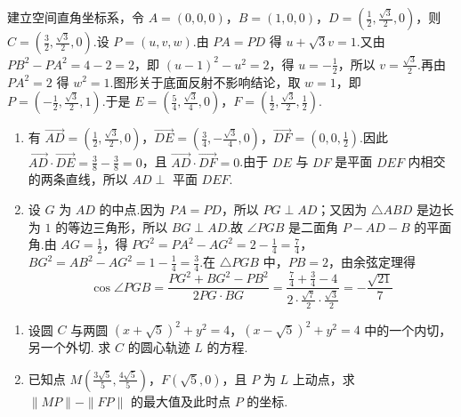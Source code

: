 \begin{solution}
建立空间直角坐标系，令 \(A=(0,0,0)\)，\(B=(1,0,0)\)，\(D=\left(\frac12,\frac{\sqrt3}{2},0\right)\)，则 \(C=\left(\frac32,\frac{\sqrt3}{2},0\right)\).设 \(P=(u,v,w)\).由 \(PA=PD\) 得 \(u+\sqrt3v=1\).又由 \(PB^2-PA^2=4-2=2\)，即 \((u-1)^2-u^2=2\)，得 \(u=-\frac12\)，所以 \(v=\frac{\sqrt3}{2}\).再由 \(PA^2=2\) 得 \(w^2=1\).图形关于底面反射不影响结论，取 \(w=1\)，即 \(P=\left(-\frac12,\frac{\sqrt3}{2},1\right)\).于是 \(E=\left(\frac54,\frac{\sqrt3}{4},0\right)\)，\(F=\left(\frac12,\frac{\sqrt3}{2},\frac12\right)\).

\begin{enumerate}
\item 有 \(\overrightarrow{AD}=\left(\frac12,\frac{\sqrt3}{2},0\right)\)，\(\overrightarrow{DE}=\left(\frac34,-\frac{\sqrt3}{4},0\right)\)，\(\overrightarrow{DF}=\left(0,0,\frac12\right)\).因此 \(\overrightarrow{AD}\cdot\overrightarrow{DE}=\frac38-\frac38=0\)，且 \(\overrightarrow{AD}\cdot\overrightarrow{DF}=0\).由于 \(DE\) 与 \(DF\) 是平面 \(DEF\) 内相交的两条直线，所以 \(AD\perp\) 平面 \(DEF\).
\item 设 \(G\) 为 \(AD\) 的中点.因为 \(PA=PD\)，所以 \(PG\perp AD\)；又因为 \(\triangle ABD\) 是边长为 \(1\) 的等边三角形，所以 \(BG\perp AD\).故 \(\angle PGB\) 是二面角 \(P-AD-B\) 的平面角.由 \(AG=\frac12\)，得 \(PG^2=PA^2-AG^2=2-\frac14=\frac74\)，\(BG^2=AB^2-AG^2=1-\frac14=\frac34\).在 \(\triangle PGB\) 中，\(PB=2\)，由余弦定理得
\[
\cos\angle PGB=\frac{PG^2+BG^2-PB^2}{2PG\cdot BG}=\frac{\frac74+\frac34-4}{2\cdot\frac{\sqrt7}{2}\cdot\frac{\sqrt3}{2}}=-\frac{\sqrt{21}}{7}
\]
\end{enumerate}
\end{solution}

\begin{problem}
\begin{enumerate}
\item 设圆 \(C\) 与两圆 \((x + \sqrt{5})^2 + y^2 = 4\)，\((x - \sqrt{5})^2 + y^2 = 4\) 中的一个内切，另一个外切. 求 \(C\) 的圆心轨迹 \(L\) 的方程.
\item 已知点 \(M\left(\frac{3\sqrt{5}}{5}, \frac{4\sqrt{5}}{5}\right)\)，\(F(\sqrt{5}, 0)\)，且 \(P\) 为 \(L\) 上动点，求 \(\|MP\| - \|FP\|\) 的最大值及此时点 \(P\) 的坐标.
\end{enumerate}
\end{problem}

